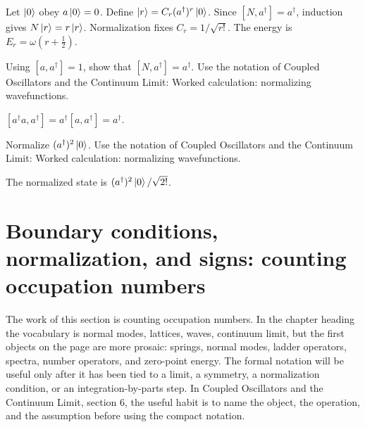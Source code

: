 \begin{example}
Let \(\left|0\right\rangle\) obey \(a\left|0\right\rangle=0\).  Define \(\left|r\right\rangle=C_r(a^\dagger)^r\left|0\right\rangle\).  Since \([N,a^\dagger]=a^\dagger\), induction gives \(N\left|r\right\rangle=r\left|r\right\rangle\).  Normalization fixes \(C_r=1/\sqrt{r!}\).  The energy is \(E_r=\omega(r+\frac12)\).
\end{example}



\begin{exercise}
Using \([a,a^\dagger]=1\), show that \([N,a^\dagger]=a^\dagger\).  Use the notation of Coupled Oscillators and the Continuum Limit: Worked calculation: normalizing wavefunctions.
\begin{answer}
\([a^\dagger a,a^\dagger]=a^\dagger[a,a^\dagger]=a^\dagger\).
\end{answer}
\end{exercise}

\begin{exercise}
Normalize \((a^\dagger)^2\left|0\right\rangle\).  Use the notation of Coupled Oscillators and the Continuum Limit: Worked calculation: normalizing wavefunctions.
\begin{answer}
The normalized state is \((a^\dagger)^2\left|0\right\rangle/\sqrt{2!}\).
\end{answer}
\end{exercise}



\section{Boundary conditions, normalization, and signs: counting occupation numbers}













The work of this section is counting occupation numbers.  In the chapter heading the vocabulary is normal modes, lattices, waves, continuum limit, but the first objects on the page are more prosaic: springs, normal modes, ladder operators, spectra, number operators, and zero-point energy.  The formal notation will be useful only after it has been tied to a limit, a symmetry, a normalization condition, or an integration-by-parts step.  In Coupled Oscillators and the Continuum Limit, section 6, the useful habit is to name the object, the operation, and the assumption before using the compact notation.

